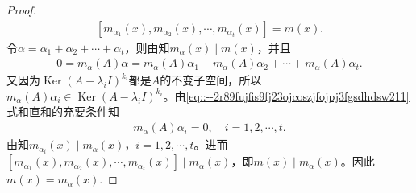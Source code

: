 \documentclass[../../main.tex]{subfiles}%
\begin{document}
\begin{proof}
\begin{align*}
\left[m_{\alpha_1}(x),m_{\alpha_2}(x),\cdots,m_{\alpha_t}(x)\right]=m(x).
\end{align*}
令$\alpha=\alpha_1+\alpha_2+\cdots+\alpha_t$，则由知$m_{\alpha}(x)\mid m(x)$，并且
\begin{align*}
0=m_{\alpha}(A)\alpha=m_{\alpha}(A)\alpha_1+m_{\alpha}(A)\alpha_2+\cdots+m_{\alpha}(A)\alpha_t.
\end{align*}
又因为$\operatorname{Ker}(A-\lambda_iI)^{k_i}$都是$A$的不变子空间，所以$m_{\alpha}(A)\alpha_i\in\operatorname{Ker}(A-\lambda_iI)^{k_i}$。由\eqref{eq::--2r89fujfis9fj23ojcoszjfojpj3fgsdhdsw211}式和直和的充要条件知
\begin{align*}
m_{\alpha}(A)\alpha_i=0,\quad i=1,2,\cdots,t.
\end{align*}
由知$m_{\alpha_i}(x)\mid m_{\alpha}(x)$，$i=1,2,\cdots,t$。进而$\left[m_{\alpha_1}(x),m_{\alpha_2}(x),\cdots,m_{\alpha_t}(x)\right]\mid m_{\alpha}(x)$，即$m(x)\mid m_{\alpha}(x)$。因此$m(x)=m_{\alpha}(x)$.
\end{proof}
\end{document}
